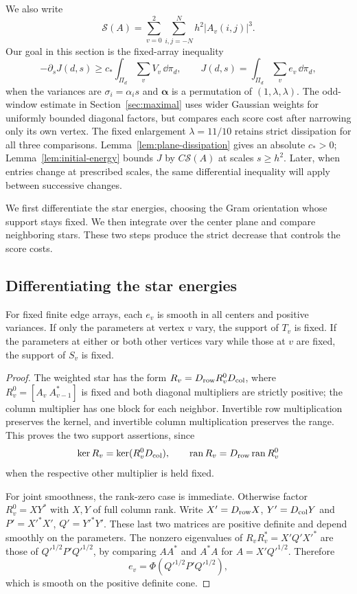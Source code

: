 We also write
\[
 \mathcal S(A)=\sum_{v=0}^2\sum_{i,j=-N}^Nh^2|A_v(i,j)|^3.
\]
Our goal in this section is the fixed-array inequality
\[
 -\partial_sJ(d,s)\ge c_*\int_{\Pi_d}\sum_vV_v\,\dd\pi_d,
 \qquad J(d,s)=\int_{\Pi_d}\sum_ve_v\,\dd\pi_d,
\]
when the variances are $\sigma_i=\alpha_i s$ and
$\boldsymbol\alpha$ is a permutation of $(1,\lambda,\lambda)$.
The odd-window estimate in Section~\ref{sec:maximal} uses wider Gaussian
weights for uniformly bounded diagonal factors, but compares each score cost
after narrowing only its own vertex. The fixed enlargement
$\lambda=11/10$ retains strict dissipation for all three comparisons.
Lemma~\ref{lem:plane-dissipation} gives an absolute $c_*>0$;
Lemma~\ref{lem:initial-energy} bounds $J$ by $C\mathcal S(A)$ at scales
$s\ge h^2$. Later, when entries change at prescribed scales, the same
differential inequality will apply between successive changes.

We first differentiate the star energies, choosing the Gram orientation
whose support stays fixed. We then integrate over the center plane and
compare neighboring stars. These two steps produce the strict decrease
that controls the score costs.

\subsection{Differentiating the star energies}

\begin{lemma}\label{lem:star-smoothness}
For fixed finite edge arrays, each $e_v$ is smooth in all centers and
positive variances.  If only the parameters at vertex $v$ vary, the support
of $T_v$ is fixed.  If the parameters at either or both other vertices
vary while those at $v$ are fixed, the support of $S_v$ is fixed.
\end{lemma}
\begin{proof}
The weighted star has the form $R_v=D_{\rm row}R_v^0D_{\rm col}$, where
$R_v^0=[A_v\ A_{v-1}^*]$ is fixed and both diagonal multipliers are strictly
positive; the column multiplier has one block for each neighbor.
Invertible row multiplication preserves the kernel, and invertible column
multiplication preserves the range.  This proves the two support
assertions, since
\[
 \ker R_v=\ker(R_v^0D_{\rm col}),\qquad
 \operatorname{ran}R_v=D_{\rm row}\operatorname{ran}R_v^0
\]
when the respective other multiplier is held fixed.

For joint smoothness, the rank-zero case is immediate.  Otherwise factor
$R_v^0=XY^*$ with $X,Y$ of full column rank.  Write
$X'=D_{\rm row}X$, $Y'=D_{\rm col}Y$ and
$P'=X'^*X'$, $Q'=Y'^*Y'$.  These last two matrices are positive definite
and depend smoothly on the parameters.  The nonzero eigenvalues of
$R_vR_v^*=X'Q'X'^*$ are those of $Q'^{1/2}P'Q'^{1/2}$, by comparing
$AA^*$ and $A^*A$ for $A=X'Q'^{1/2}$.  Therefore
\[
 e_v=\Phi(Q'^{1/2}P'Q'^{1/2}),
\]
which is smooth on the positive definite cone.
\end{proof}

